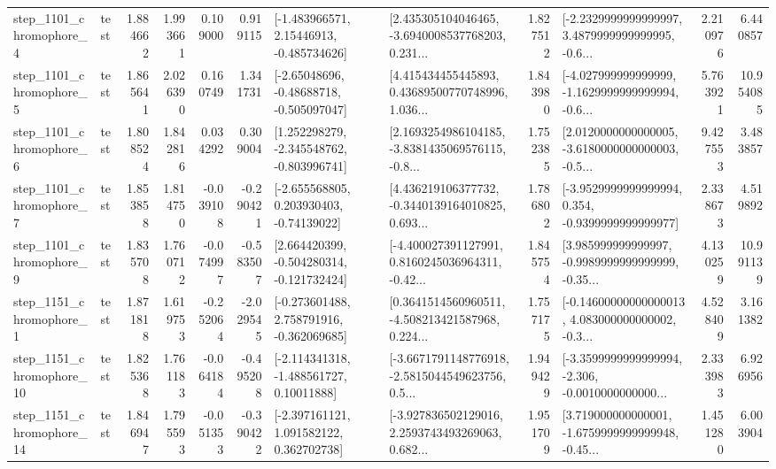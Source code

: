 \begin{tabular}{llrrrrllrlrr}
  step\_1101\_chromophore\_4 &      test &      1.884662 &    1.993661 &      0.109000 &  0.919115 &    [-1.483966571, 2.15446913, -0.485734626] &  [2.435305104046465, -3.6940008537768203, 0.231... &       1.827512 &  [-2.2329999999999997, 3.4879999999999995, -0.6... &            2.210976 &          6.440857 \\
  step\_1101\_chromophore\_5 &      test &      1.865641 &    2.026390 &      0.160749 &  1.341731 &    [-2.65048696, -0.48688718, -0.505097047] &  [4.415434455445893, 0.43689500770748996, 1.036... &       1.843980 &  [-4.027999999999999, -1.1629999999999994, -0.6... &            5.763921 &         10.954085 \\
  step\_1101\_chromophore\_6 &      test &      1.808524 &    1.842816 &      0.034292 &  0.309004 &   [1.252298279, -2.345548762, -0.803996741] &  [2.1693254986104185, -3.8381435069576115, -0.8... &       1.752385 &  [2.0120000000000005, -3.6180000000000003, -0.5... &            9.427553 &          3.483857 \\
  step\_1101\_chromophore\_7 &      test &      1.853858 &    1.814750 &     -0.039108 & -0.290421 &    [-2.655568805, 0.203930403, -0.74139022] &  [4.436219106377732, -0.3440139164010825, 0.693... &       1.786802 &  [-3.9529999999999994, 0.354, -0.9399999999999977] &            2.338673 &          4.519892 \\
  step\_1101\_chromophore\_9 &      test &      1.835708 &    1.760712 &     -0.074997 & -0.583507 &   [2.664420399, -0.504280314, -0.121732424] &  [-4.400027391127991, 0.8160245036964311, -0.42... &       1.845754 &  [3.985999999999997, -0.9989999999999999, -0.35... &            4.130259 &         10.991139 \\
  step\_1151\_chromophore\_1 &      test &      1.871818 &    1.619753 &     -0.252064 & -2.029545 &   [-0.273601488, 2.758791916, -0.362069685] &  [0.3641514560960511, -4.508213421587968, 0.224... &       1.757175 &  [-0.14600000000000013, 4.083000000000002, -0.3... &            4.528409 &          3.161382 \\
 step\_1151\_chromophore\_10 &      test &      1.825368 &    1.761183 &     -0.064184 & -0.495208 &    [-2.114341318, -1.488561727, 0.10011888] &  [-3.6671791148776918, -2.5815044549623756, 0.5... &       1.949429 &  [-3.3599999999999994, -2.306, -0.0010000000000... &            2.333983 &          6.926956 \\
 step\_1151\_chromophore\_14 &      test &      1.846947 &    1.795593 &     -0.051353 & -0.390422 &    [-2.397161121, 1.091582122, 0.362702738] &  [-3.927836502129016, 2.2593743493269063, 0.682... &       1.951709 &  [3.719000000000001, -1.6759999999999948, -0.45... &            1.451280 &          6.003904 \\

\end{tabular}

